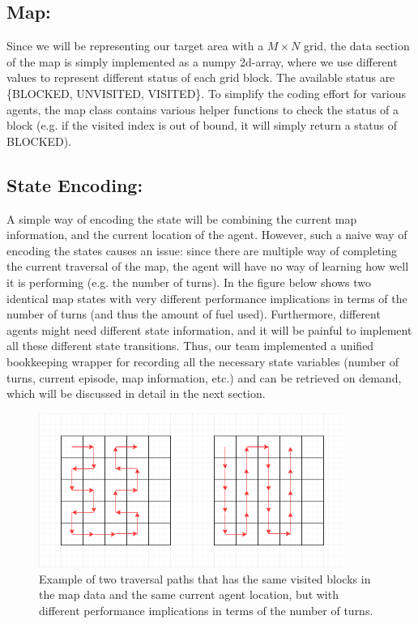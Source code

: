 \documentclass{article}
\begin{document}
\begin{normalsize}
		    \subsection{Map:}
		        
		        Since we will be representing our target area with a $M \times N$ grid, the data section of the map is simply implemented as a numpy 2d-array, where we use different values to represent different status of each grid block. The available status are \{BLOCKED, UNVISITED, VISITED\}. To simplify the coding effort for various agents, the map class contains various helper functions to check the status of a block (e.g. if the visited index is out of bound, it will simply return a status of BLOCKED). 
		        
		    \subsection{State Encoding:}
    	        
    	        A simple way of encoding the state will be combining the current map information, and the current location of the agent. However, such a naive way of encoding the states causes an issue: since there are multiple way of completing the current traversal of the map, the agent will have no way of learning how well it is performing (e.g. the number of turns). In the figure below shows two identical map states with very different performance implications in terms of the number of turns (and thus the amount of fuel used). Furthermore, different agents might need different state information, and it will be painful to implement all these different state transitions. Thus, our team implemented a unified bookkeeping wrapper for recording all the necessary state variables (number of turns, current episode, map information, etc.) and can be retrieved on demand, which will be discussed in detail in the next section.
    	        
    	        \begin{figure}[htp]
                    \centering
                    \includegraphics[width=10cm]{state.png}
                    \caption{Example of two traversal paths that has the same visited blocks in the map data and the same current agent location, but with different performance implications in terms of the number of turns.}
                \end{figure}
		        

\end{normalsize}
\end{document}
